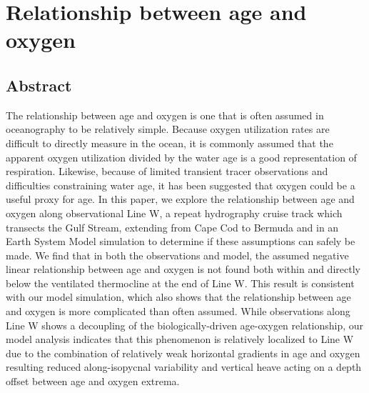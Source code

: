 \graphicspath{{figures/chapter-oxygen/}}

\chapter{Relationship between age and oxygen}
\label{cha:oxygen}

\section{Abstract}
The relationship between age and oxygen is one that is often assumed in oceanography to be relatively simple. Because oxygen utilization rates are difficult to directly measure in the ocean, it is commonly assumed that the apparent oxygen utilization divided by the water age is a good representation of respiration. Likewise, because of limited transient tracer observations and difficulties constraining water age, it has been suggested that oxygen could be a useful proxy for age. In this paper, we explore the relationship between age and oxygen along observational Line W, a repeat hydrography cruise track which transects the Gulf Stream, extending from Cape Cod to Bermuda and in an Earth System Model simulation to determine if these assumptions can safely be made. We find that in both the observations and model, the assumed negative linear relationship between age and oxygen is not found both within and directly below the ventilated thermocline at the end of Line W. This result is consistent with our model simulation, which also shows that the relationship between age and oxygen is more complicated than often assumed. While observations along Line W shows a decoupling of the biologically-driven age-oxygen relationship, our model analysis indicates that this phenomenon is relatively localized to Line W due to the combination of relatively weak horizontal gradients in age and oxygen resulting reduced along-isopycnal variability and vertical heave acting on a depth offset between age and oxygen extrema.


